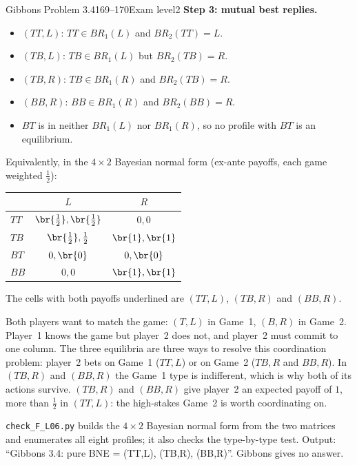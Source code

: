 \begin{exsol}{Gibbons Problem 3.4}{169--170}{Exam level}{2}
\textbf{Step 3: mutual best replies.}
\begin{itemize}
  \item $(TT, L)$: $TT \in BR_1(L)$ and $BR_2(TT) = L$. \checkmark
  \item $(TB, L)$: $TB \in BR_1(L)$ but $BR_2(TB) = R$. \texttimes
  \item $(TB, R)$: $TB \in BR_1(R)$ and $BR_2(TB) = R$. \checkmark
  \item $(BB, R)$: $BB \in BR_1(R)$ and $BR_2(BB) = R$. \checkmark
  \item $BT$ is in neither $BR_1(L)$ nor $BR_1(R)$, so no profile with $BT$ is an equilibrium.
\end{itemize}
Equivalently, in the $4 \times 2$ Bayesian normal form (ex-ante payoffs, each game weighted
$\frac12$):
\begin{center}
\begin{tabular}{l|cc}
& $L$ & $R$\\\hline
$TT$ & $\br{\tfrac12}, \br{\tfrac12}$ & $0, 0$\\
$TB$ & $\br{\tfrac12}, \tfrac12$ & $\br{1}, \br{1}$\\
$BT$ & $0, \br{0}$ & $0, \br{0}$\\
$BB$ & $0, 0$ & $\br{1}, \br{1}$
\end{tabular}
\end{center}
The cells with both payoffs underlined are $(TT,L)$, $(TB,R)$ and $(BB,R)$.

\interp Both players want to match the game: $(T,L)$ in Game~1, $(B,R)$ in Game~2. Player~1 knows
the game but player~2 does not, and player~2 must commit to one column. The three equilibria are
three ways to resolve this coordination problem: player~2 bets on Game~1 ($TT, L$) or on Game~2
($TB, R$ and $BB, R$). In $(TB, R)$ and $(BB, R)$ the Game~1 type is indifferent, which is why both
of its actions survive. $(TB,R)$ and $(BB,R)$ give player~2 an expected payoff of $1$, more than
$\frac12$ in $(TT,L)$: the high-stakes Game~2 is worth coordinating on.

\verify \texttt{check\_F\_L06.py} builds the $4\times 2$ Bayesian normal form from the two matrices
and enumerates all eight profiles; it also checks the type-by-type test. Output: ``Gibbons 3.4: pure
BNE = (TT,L), (TB,R), (BB,R)''. Gibbons gives no answer.


\end{exsol}
